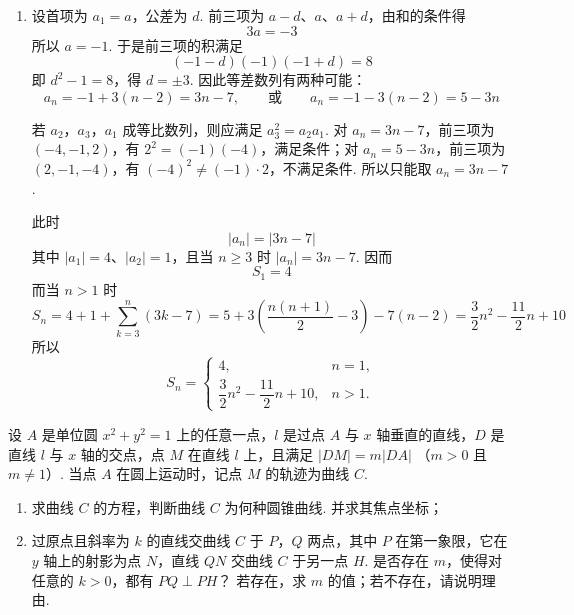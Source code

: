 \begin{solution}
\begin{enumerate}
\item 设首项为 \(a_1=a\)，公差为 \(d\). 前三项为 \(a-d\)、\(a\)、\(a+d\)，由和的条件得
\[
3a=-3
\]
所以 \(a=-1\). 于是前三项的积满足
\[
(-1-d)(-1)(-1+d)=8
\]
即 \(d^{2}-1=8\)，得 \(d=\pm3\). 因此等差数列有两种可能：
\[
a_n=-1+3(n-2)=3n-7,
\qquad\text{或}\qquad
a_n=-1-3(n-2)=5-3n
\]

若 \(a_{2}\)，\(a_{3}\)，\(a_{1}\) 成等比数列，则应满足 \(a_{3}^{2}=a_{2}a_{1}\). 对 \(a_n=3n-7\)，前三项为 \((-4,-1,2)\)，有 \(2^{2}=(-1)(-4)\)，满足条件；对 \(a_n=5-3n\)，前三项为 \((2,-1,-4)\)，有 \((-4)^{2}\neq(-1)\cdot2\)，不满足条件. 所以只能取 \(a_n=3n-7\).

此时
\[
|a_n|=|3n-7|
\]
其中 \(|a_1|=4\)、\(|a_2|=1\)，且当 \(n\geqslant3\) 时 \(|a_n|=3n-7\). 因而
\[
S_1=4
\]
而当 \(n>1\) 时
\[
S_n=4+1+\sum_{k=3}^{n}(3k-7)
 =5+3\left(\frac{n(n+1)}2-3\right)-7(n-2)
 =\frac32n^{2}-\frac{11}{2}n+10
\]
所以
\[
S_n=\begin{cases}
4,&n=1,\\
\dfrac32n^{2}-\dfrac{11}{2}n+10,&n>1.
\end{cases}
\]
\end{enumerate}
\end{solution}

\begin{problem}
设 \(A\) 是单位圆 \(x^{2} + y^{2} = 1\) 上的任意一点，\(l\) 是过点 \(A\) 与 \(x\) 轴垂直的直线，\(D\) 是直线 \(l\) 与 \(x\) 轴的交点，点 \(M\) 在直线 \(l\) 上，且满足 \(|DM| = m|DA|\) （\(m > 0\) 且 \(m \neq 1\)）. 当点 \(A\) 在圆上运动时，记点 \(M\) 的轨迹为曲线 \(C\).
\begin{enumerate}
\item 求曲线 \(C\) 的方程，判断曲线 \(C\) 为何种圆锥曲线. 并求其焦点坐标；
\item 过原点且斜率为 \(k\) 的直线交曲线 \(C\) 于 \(P\)，\(Q\) 两点，其中 \(P\) 在第一象限，它在 \(y\) 轴上的射影为点 \(N\)，直线 \(QN\) 交曲线 \(C\) 于另一点 \(H\). 是否存在 \(m\)，使得对任意的 \(k > 0\)，都有 \(PQ \perp PH\)？ 若存在，求 \(m\) 的值；若不存在，请说明理由.
\end{enumerate}
\end{problem}

